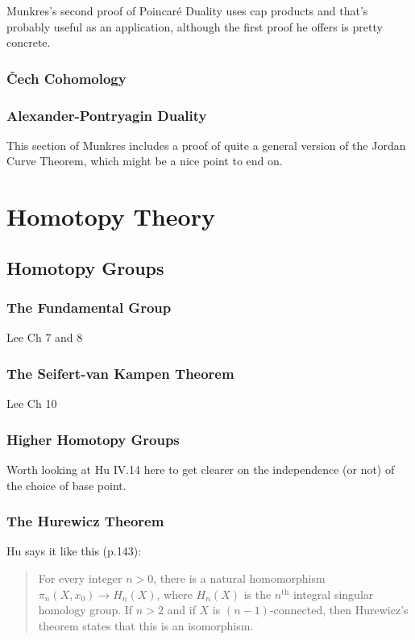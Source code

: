 \documentclass[oneside,english]{amsbook}
\numberwithin{section}{chapter}
\theoremstyle{plain}
\theoremstyle{definition}
\providecommand{\Cech}{\v{C}ech }
\begin{document}
	Munkres's second proof of Poincar\'e Duality uses cap products and that's probably useful as an application, although the first proof he offers is pretty concrete.
	
	\section{\Cech Cohomology}
	\section{Alexander-Pontryagin Duality}
	
	This section of Munkres includes a proof of quite a general version of the Jordan Curve Theorem, which might be a nice point to end on.
	
	\part{Homotopy Theory}
	
	\chapter{Homotopy Groups}
	
	\section{The Fundamental Group}
	
	Lee Ch 7 and 8
	
	\section{The Seifert-van Kampen Theorem}
	
	Lee Ch 10
	
	\section{Higher Homotopy Groups}
	
	Worth looking at Hu IV.14 here to get clearer on the independence (or not) of the choice of base point.

	\section{The Hurewicz Theorem}
	
	Hu says it like this (p.143):
	\begin{quote}
		For every integer $n > 0$, there is a natural homomorphism $\pi_n(X, x_0)\to H_n(X)$, where $H_n(X)$ is the $n^\text{th}$ integral singular homology group. If $n > 2$ and if $X$ is $(n - 1)$-connected, then Hurewicz's theorem states that this is an isomorphism. 
	\end{quote}
	
\end{document}
